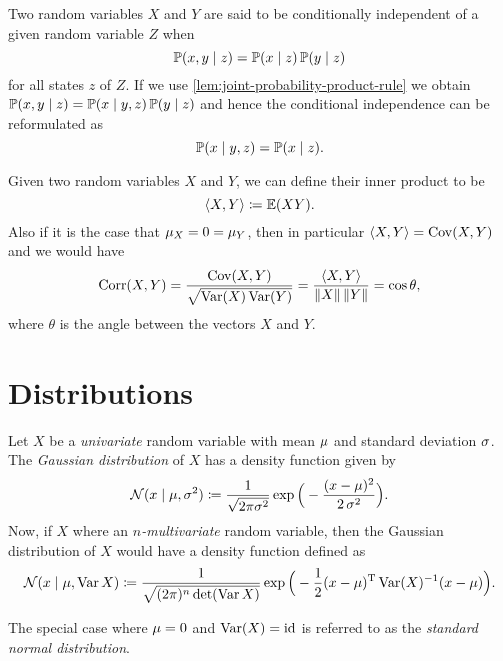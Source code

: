 \begin{definition}
\label{def:conditional-independence}
Two random variables \(X\) and \(Y\) are said to be conditionally independent of
a given random variable \(Z\) when
\[
\operatorname{\mathbb{P}}(x, y \mid z) = \operatorname{\mathbb{P}}(x \mid z) \operatorname{\mathbb{P}}(y \mid z)
\]
for all states \(z\) of \(Z\). If we use
\cref{lem:joint-probability-product-rule} we obtain \(\operatorname{\mathbb{P}}(x, y \mid z) =
\operatorname{\mathbb{P}}(x \mid y, z) \operatorname{\mathbb{P}}(y \mid z)\) and hence the conditional independence can
be reformulated as
\[
\operatorname{\mathbb{P}}(x \mid y, z) = \operatorname{\mathbb{P}}(x \mid z).
\]
\end{definition}

\begin{definition}
\label{def:inner-product-random-variables}
Given two random variables \(X\) and \(Y\), we can define their inner product to
be
\[
\langle X, Y \rangle \coloneq \operatorname{\mathbb{E}}(X Y).
\]
Also if it is the case that \(\mu_X = 0 = \mu_Y\), then in particular
\(\langle X, Y \rangle = \operatorname{Cov}(X, Y)\) and we would have
\[
\operatorname{Corr}(X, Y) = \frac{\operatorname{Cov}(X, Y)}{\sqrt{\operatorname{Var}(X) \operatorname{Var}(Y)}}
= \frac{\langle X, Y \rangle}{\| X \|\, \| Y \|} = \cos \theta,
\]
where \(\theta\) is the angle between the vectors \(X\) and \(Y\).
\end{definition}

\section{Distributions}

\begin{definition}
\label{def:gaussian-distribution}
Let \(X\) be a \emph{univariate} random variable with mean \(\mu\) and
standard deviation \(\operatorname{\sigma}\). The \emph{Gaussian distribution} of \(X\) has a
density function given by
\[
\operatorname{\mathcal{N}}(x \mid \mu, \operatorname{\sigma}^2) \coloneq \frac{1}{\sqrt{2 \pi \sigma^{2}}}
\exp\Big( -\frac{(x - \mu)^2}{2 \operatorname{\sigma}^2} \Big).
\]
Now, if \(X\) where an \emph{\(n\)-multivariate} random variable, then the Gaussian
distribution of \(X\) would have a density function defined as
\[
\operatorname{\mathcal{N}}(x \mid \mu, \operatorname{Var} X) \coloneq \frac{1}{\sqrt{(2 \pi)^n \det(\operatorname{Var} X)}}
\exp\Big(-\frac{1}{2} (x - \mu)^{\operatorname{T}} \operatorname{Var}(X)^{-1} (x - \mu)\Big).
\]

The special case where \(\mu = 0\) and \(\operatorname{Var}(X) = \operatorname{id}\) is referred to as the
\emph{standard normal distribution}.
\end{definition}

